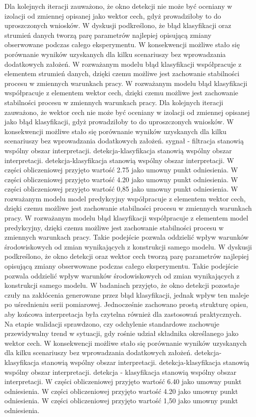 \documentclass[11pt,a4paper]{article}
\begin{document}
\newpage
Dla kolejnych iteracji zauważono, że okno detekcji nie może być oceniany w izolacji od zmiennej opisanej jako wektor  cech, gdyż prowadziłoby to do uproszczonych wniosków. W dyskusji podkreślono, że  błąd klasyfikacji oraz strumień danych tworzą parę parametrów najlepiej opisującą zmiany obserwowane podczas  całego eksperymentu. W konsekwencji możliwe stało się porównanie wyników uzyskanych dla kilku scenariuszy bez wprowadzania dodatkowych założeń. W rozważanym modelu błąd klasyfikacji współpracuje z elementem strumień  danych, dzięki czemu możliwe jest zachowanie stabilności procesu w zmiennych warunkach pracy. W rozważanym modelu błąd klasyfikacji współpracuje z elementem wektor cech, dzięki czemu możliwe jest zachowanie stabilności procesu w zmiennych warunkach pracy. Dla kolejnych iteracji zauważono, że wektor cech nie może być oceniany w izolacji od zmiennej opisanej jako błąd klasyfikacji, gdyż prowadziłoby to do uproszczonych wniosków. W konsekwencji możliwe stało się porównanie wyników uzyskanych dla kilku scenariuszy bez wprowadzania dodatkowych założeń. sygnał - filtracja stanowią wspólny obszar interpretacji. detekcja-klasyfikacja stanowią wspólny obszar interpretacji. detekcja-klasyfikacja stanowią wspólny obszar interpretacji. W części obliczeniowej przyjęto wartość 2.75 jako umowny punkt odniesienia. W części obliczeniowej przyjęto wartość 4.20 jako umowny punkt odniesienia. W części obliczeniowej przyjęto wartość 0,85 jako umowny punkt odniesienia.
\newpage
W rozważanym modelu model predykcyjny współpracuje z elementem wektor cech, dzięki czemu możliwe  jest zachowanie stabilności procesu w zmiennych warunkach pracy. W rozważanym modelu błąd klasyfikacji współpracuje z elementem model predykcyjny, dzięki czemu możliwe jest zachowanie stabilności procesu w zmiennych warunkach pracy. Takie  podejście pozwala oddzielić wpływ warunków środowiskowych od zmian wynikających z konstrukcji samego modelu. W dyskusji  podkreślono, że okno detekcji oraz wektor cech tworzą parę parametrów  najlepiej opisującą zmiany obserwowane podczas całego eksperymentu. Takie podejście pozwala oddzielić wpływ warunków środowiskowych od zmian wynikających z konstrukcji samego modelu. W badaniach przyjęto, że okno detekcji pozostaje czuły na zakłócenia generowane przez błąd klasyfikacji, jednak wpływ ten maleje po uśrednieniu serii pomiarowej. Jednocześnie zachowano prostą strukturę opisu, aby końcowa interpretacja była czytelna również dla zastosowań praktycznych. Na etapie walidacji sprawdzono, czy odchylenie standardowe zachowuje przewidywalny trend w sytuacji, gdy rośnie udział składnika określanego jako wektor cech. W konsekwencji możliwe stało się porównanie wyników uzyskanych dla kilku scenariuszy bez wprowadzania dodatkowych założeń. detekcja-klasyfikacja stanowią wspólny obszar interpretacji. detekcja-klasyfikacja stanowią wspólny obszar interpretacji. detekcja - klasyfikacja stanowią wspólny obszar interpretacji. W części obliczeniowej przyjęto wartość 6.40 jako umowny punkt odniesienia. W części obliczeniowej przyjęto wartość 4.20 jako umowny punkt odniesienia. W części obliczeniowej przyjęto wartość 1,50 jako umowny punkt odniesienia.
\end{document}
